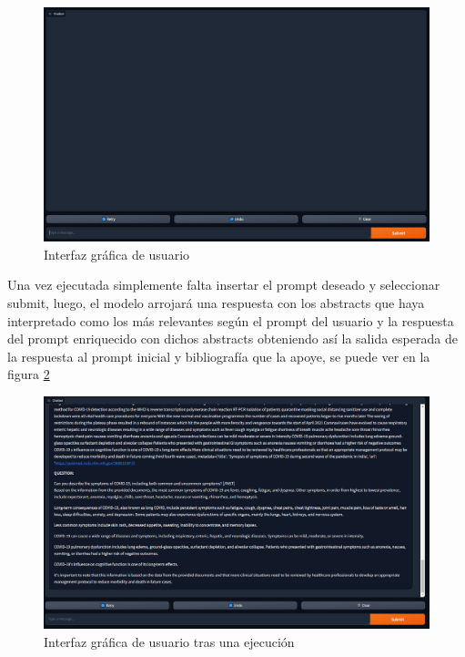 \begin{figure}[h!]
    \centering
    \includegraphics[width=1\textwidth]{img/guivacia.png}
    \caption{Interfaz gráfica de usuario}
    \label{fig:guivacia}
\end{figure}

Una vez ejecutada simplemente falta insertar el prompt deseado y seleccionar submit, luego, el modelo arrojará una respuesta con los abstracts que haya interpretado como los más relevantes según el prompt del usuario y la respuesta del prompt enriquecido con dichos abstracts obteniendo así la salida esperada de la respuesta al prompt inicial y bibliografía que la apoye, se puede ver en la figura \ref{fig:guirellena}

\begin{figure}[h!]
    \centering
    \includegraphics[width=1\textwidth]{img/guirellena.png}
    \caption{Interfaz gráfica de usuario tras una ejecución}
    \label{fig:guirellena}
\end{figure}